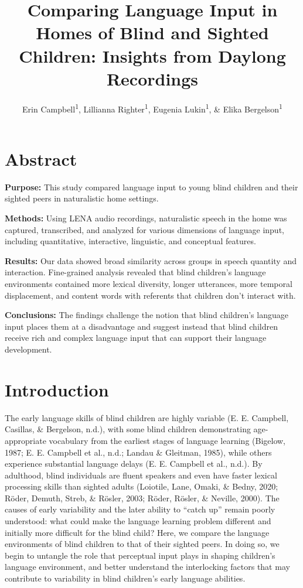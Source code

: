 \documentclass[
  man]{apa6}
\title{Comparing Language Input in Homes of Blind and Sighted Children: Insights from Daylong Recordings}
\author{Erin Campbell\textsuperscript{1}, Lillianna Righter\textsuperscript{1}, Eugenia Lukin\textsuperscript{1}, \& Elika Bergelson\textsuperscript{1}}
\date{}
\affiliation{\vspace{0.5cm}\textsuperscript{1} Department of Psychology \& Neuroscience, Duke University, Durham, NC}
\begin{document}
\maketitle

\hypertarget{abstract}{%
\section{Abstract}\label{abstract}}

\textbf{Purpose:} This study compared language input to young blind children and their sighted peers in naturalistic home settings.

\textbf{Methods:} Using LENA audio recordings, naturalistic speech in the home was captured, transcribed, and analyzed for various dimensions of language input, including quantitative, interactive, linguistic, and conceptual features.

\textbf{Results:} Our data showed broad similarity across groups in speech quantity and interaction. Fine-grained analysis revealed that blind children's language environments contained more lexical diversity, longer utterances, more temporal displacement, and content words with referents that children don't interact with.

\textbf{Conclusions:} The findings challenge the notion that blind children's language input places them at a disadvantage and suggest instead that blind children receive rich and complex language input that can support their language development.

\hypertarget{introduction}{%
\section{Introduction}\label{introduction}}

The early language skills of blind children are highly variable (E. E. Campbell, Casillas, \& Bergelson, n.d.), with some blind children demonstrating age-appropriate vocabulary from the earliest stages of language learning (Bigelow, 1987; E. E. Campbell et al., n.d.; Landau \& Gleitman, 1985), while others experience substantial language delays (E. E. Campbell et al., n.d.). By adulthood, blind individuals are fluent speakers and even have faster lexical processing skills than sighted adults (Loiotile, Lane, Omaki, \& Bedny, 2020; Röder, Demuth, Streb, \& Rösler, 2003; Röder, Rösler, \& Neville, 2000). The causes of early variability and the later ability to ``catch up'' remain poorly understood: what could make the language learning problem different and initially more difficult for the blind child? Here, we compare the language environments of blind children to that of their sighted peers. In doing so, we begin to untangle the role that perceptual input plays in shaping children's language environment, and better understand the interlocking factors that may contribute to variability in blind children's early language abilities.
\end{document}

